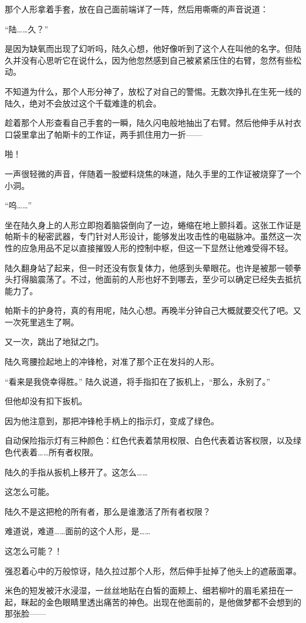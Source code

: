 那个人形拿着手套，放在自己面前端详了一阵，然后用嘶嘶的声音说道：

“陆……久？”

是因为缺氧而出现了幻听吗，陆久心想，他好像听到了这个人在叫他的名字。但陆久并没有心思听它在说什么，因为他忽然感到自己被紧紧压住的右臂，忽然有些松动。

不知道为什么，那个人形分神了，放松了对自己的警惕。无数次挣扎在生死一线的陆久，绝对不会放过这个千载难逢的机会。

趁着那个人形查看自己手套的一瞬，陆久闪电般地抽出了右臂。然后他伸手从衬衣口袋里拿出了帕斯卡的工作证，两手抓住用力一折——

啪！

一声很轻微的声音，伴随着一股塑料烧焦的味道，陆久手里的工作证被烧穿了一个小洞。

“呜……”

坐在陆久身上的人形立即抱着脑袋倒向了一边，蜷缩在地上颤抖着。这张工作证是帕斯卡的秘密武器，专门针对人形设计，能够发出攻击性的电磁脉冲。虽然这一次性的应急用品不足以直接摧毁人形的控制中枢，但这一下显然让他难受得不轻。

陆久翻身站了起来，但一时还没有恢复体力，他感到头晕眼花。也许是被那一顿拳头打得脑震荡了。不过，他面前的人形也好不到哪去，至少可以确定已经失去抵抗能力了。

帕斯卡的护身符，真的有用呢，陆久心想。再晚半分钟自己大概就要交代了吧。又一次死里逃生了啊。

又一次，跳出了地狱之门。

陆久弯腰捡起地上的冲锋枪，对准了那个正在发抖的人形。

“看来是我侥幸得胜。” 陆久说道，将手指扣在了扳机上，“那么，永别了。”

但他却没有扣下扳机。

因为他注意到，那把冲锋枪手柄上的指示灯，变成了绿色。

自动保险指示灯有三种颜色：红色代表着禁用权限、白色代表着访客权限，以及绿色代表着……所有者权限。

陆久的手指从扳机上移开了。这怎么……

这怎么可能。

陆久不是这把枪的所有者，那么是谁激活了所有者权限？

难道说，难道……面前的这个人形，是……

这怎么可能？！

强忍着心中的万般惊讶，陆久拉过那个人形，然后伸手扯掉了他头上的遮蔽面罩。

米色的短发被汗水浸湿，一丝丝地贴在白皙的面颊上、细若柳叶的眉毛紧扭在一起，眯起的金色眼睛里透出痛苦的神色。出现在他面前的，是他做梦都不会想到的那张脸——

